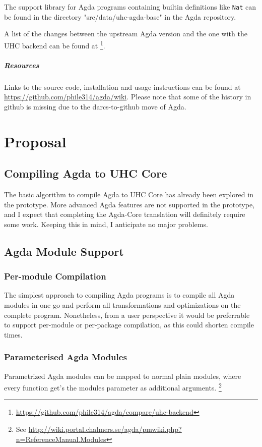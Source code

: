 \documentclass[12pt, a4paper, twoside]{report}
\begin{document}
The support library for Agda programs containing builtin definitions like \texttt{Nat} can
be found in the directory "src/data/uhc-agda-base" in the Agda repository.


A list of the changes between the upstream Agda version and the one with the UHC backend can be found at \footnote{\url{https://github.com/phile314/agda/compare/uhc-backend}}.

\paragraph{Resources}
Links to the source code, installation and usage instructions can be found
at \url{https://github.com/phile314/agda/wiki}. Please note that some of the
history in github is missing due to the darcs-to-github move of Agda.

\chapter{Proposal}
\label{chp:proposal}



\section{Compiling Agda to UHC Core}
The basic algorithm to compile Agda to UHC Core has already been explored in the prototype. More
advanced Agda features are not supported in the prototype, and I expect that completing the
Agda-Core translation will definitely require some work. Keeping this in mind,
I anticipate no major problems.

\section{Agda Module Support}
\subsection{Per-module Compilation}
The simplest approach to compiling Agda programs is to compile all Agda modules in one go
and perform all transformations and optimizations on the complete program. Nonetheless, from
a user perspective it would be preferrable to support per-module or per-package compilation,
as this could shorten compile times.

\subsection{Parameterised Agda Modules}
Parametrized Agda modules can be mapped to normal plain modules, where every function get's the
modules parameter as additional arguments.
\footnote{See \url{http://wiki.portal.chalmers.se/agda/pmwiki.php?n=ReferenceManual.Modules}}
\end{document}
